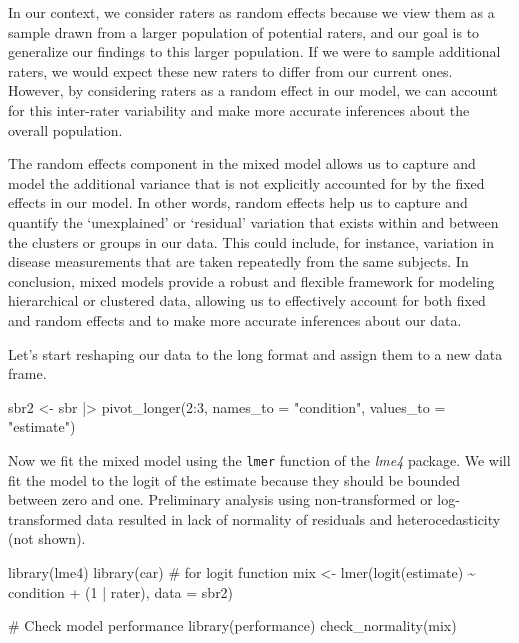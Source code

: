 \documentclass[
  letterpaper,
]{book}
\newenvironment{Shaded}{\begin{snugshade}}{\end{snugshade}}
\newcommand{\AttributeTok}[1]{\textcolor[rgb]{0.40,0.45,0.13}{#1}}
\newcommand{\CommentTok}[1]{\textcolor[rgb]{0.37,0.37,0.37}{#1}}
\newcommand{\DecValTok}[1]{\textcolor[rgb]{0.68,0.00,0.00}{#1}}
\newcommand{\FunctionTok}[1]{\textcolor[rgb]{0.28,0.35,0.67}{#1}}
\newcommand{\NormalTok}[1]{\textcolor[rgb]{0.00,0.23,0.31}{#1}}
\newcommand{\OtherTok}[1]{\textcolor[rgb]{0.00,0.23,0.31}{#1}}
\newcommand{\SpecialCharTok}[1]{\textcolor[rgb]{0.37,0.37,0.37}{#1}}
\newcommand{\StringTok}[1]{\textcolor[rgb]{0.13,0.47,0.30}{#1}}
\begin{document}
In our context, we consider raters as random effects because we view
them as a sample drawn from a larger population of potential raters, and
our goal is to generalize our findings to this larger population. If we
were to sample additional raters, we would expect these new raters to
differ from our current ones. However, by considering raters as a random
effect in our model, we can account for this inter-rater variability and
make more accurate inferences about the overall population.

The random effects component in the mixed model allows us to capture and
model the additional variance that is not explicitly accounted for by
the fixed effects in our model. In other words, random effects help us
to capture and quantify the `unexplained' or `residual' variation that
exists within and between the clusters or groups in our data. This could
include, for instance, variation in disease measurements that are taken
repeatedly from the same subjects. In conclusion, mixed models provide a
robust and flexible framework for modeling hierarchical or clustered
data, allowing us to effectively account for both fixed and random
effects and to make more accurate inferences about our data.

Let's start reshaping our data to the long format and assign them to a
new data frame.

\begin{Shaded}
\begin{Highlighting}[]
\NormalTok{sbr2 }\OtherTok{\textless{}{-}}\NormalTok{ sbr }\SpecialCharTok{|\textgreater{}} 
  \FunctionTok{pivot\_longer}\NormalTok{(}\DecValTok{2}\SpecialCharTok{:}\DecValTok{3}\NormalTok{, }\AttributeTok{names\_to =} \StringTok{"condition"}\NormalTok{, }\AttributeTok{values\_to =} \StringTok{"estimate"}\NormalTok{)}
\end{Highlighting}
\end{Shaded}

Now we fit the mixed model using the \texttt{lmer} function of the
\emph{lme4} package. We will fit the model to the logit of the estimate
because they should be bounded between zero and one. Preliminary
analysis using non-transformed or log-transformed data resulted in lack
of normality of residuals and heterocedasticity (not shown).

\begin{Shaded}
\begin{Highlighting}[]
\FunctionTok{library}\NormalTok{(lme4) }
\FunctionTok{library}\NormalTok{(car) }\CommentTok{\# for logit function}
\NormalTok{mix }\OtherTok{\textless{}{-}} \FunctionTok{lmer}\NormalTok{(}\FunctionTok{logit}\NormalTok{(estimate) }\SpecialCharTok{\textasciitilde{}}\NormalTok{ condition }\SpecialCharTok{+}\NormalTok{ (}\DecValTok{1} \SpecialCharTok{|}\NormalTok{ rater), }\AttributeTok{data =}\NormalTok{ sbr2)}

\CommentTok{\# Check model performance}
\FunctionTok{library}\NormalTok{(performance)}
\FunctionTok{check\_normality}\NormalTok{(mix)}
\end{Highlighting}
\end{Shaded}
\end{document}
